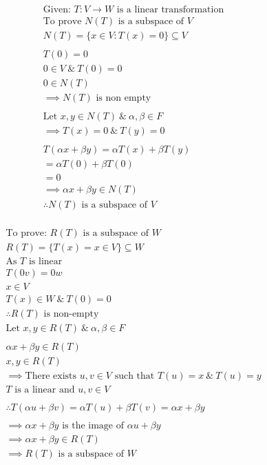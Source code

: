 \documentclass[english,course,fleqn]{lecture}
\newenvironment{qanda}{\begin{enumerate}\setlength{\parindent}{0pt}}{\medskip\end{enumerate}}
\begin{document}
\begin{qanda}
  \begin{gather*}
    \text{Given: } T:V\rightarrow W \text{ is a linear transformation}\\
    \text{To prove $N(T)$ is a subspace of $V$}\\
    N(T) = \{x \in V:T(x) = 0\} \subseteq V\\
    \\
    T(0) = 0\\
    0 \in V ~\&~ T(0) = 0\\
    0 \in N(T)\\
    \implies N(T) \text{ is non empty}\\
    \\
    \text{Let }x,y \in N(T) ~\&~ \alpha, \beta \in F\\
    \implies T(x) = 0 ~\&~ T(y) = 0\\
    \\
    T(\alpha x + \beta y) = \alpha T(x) + \beta T(y)\\
    = \alpha T(0) + \beta T(0)\\
    = 0\\
    \implies \alpha x + \beta y \in N(T)\\
    \therefore N(T) \text{ is a subspace of $V$}\\
  \end{gather*}

  \begin{gather*}
    \text{To prove: $R(T)$ is a subspace of $W$}\\
    R(T) = \{T(x) = x \in V\} \subseteq W\\
    \text{As $T$ is linear}\\
    T(0v) = 0w\\
    x \in V\\
    T(x) \in W ~\&~ T(0) = 0\\
  \therefore R(T) \text{ is non-empty}\\
    \text{Let }x,y \in R(T) ~\&~ \alpha, \beta \in F \\
    \\
    \alpha x + \beta y \in R(T)\\
    x,y \in R(T)\\
    \implies \text{There exists $u,v \in V$ such that $T(u) = x ~\&~ T(u) = y$}\\
    \text{$T$ is a linear and $u,v \in V$}\\
    \\
    \therefore T(\alpha u + \beta v) = \alpha T(u) + \beta T(v) = \alpha x + \beta y\\ 
    \\
    \implies \alpha x + \beta y \text{ is the image of $\alpha u + \beta y$}\\
    \implies \alpha x + \beta y \in R(T)\\
    \implies R(T) \text{ is a subspace of $W$}
  \end{gather*}

\end{qanda}
\end{document}
